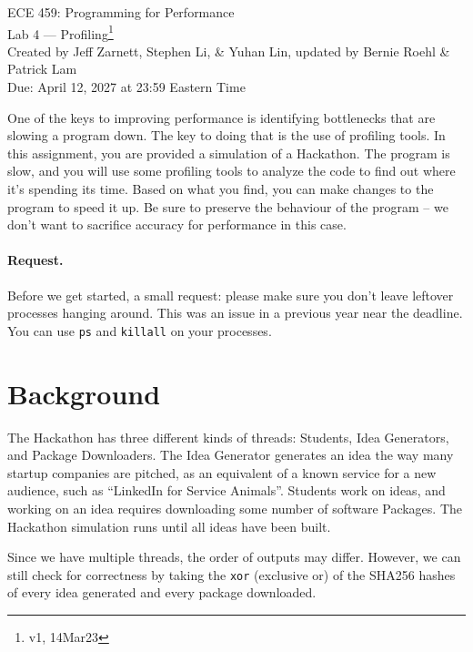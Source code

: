 



\begin{center}
{\Large ECE 459: Programming for Performance}\\
{\Large Lab 4 --- Profiling\footnote{v1, 14Mar23}}\\[1em]
{
Created by Jeff Zarnett, Stephen Li, \& Yuhan Lin, updated by Bernie Roehl \& Patrick Lam
}\\
Due: April 12, 2027 at 23:59 Eastern Time
\end{center}


One of the keys to improving performance is identifying bottlenecks that are slowing a program down. The key to doing that is the use of profiling tools. In this assignment, you are provided a simulation of a Hackathon. The program is slow, and you will use some profiling tools to analyze the code to find out where it's spending its time. Based on what you find, you can make changes to the program to speed it up. Be sure to preserve the behaviour of the program -- we don't want to sacrifice accuracy for performance in this case.

\paragraph{Request.} Before we get started, a small request: please make sure you don't leave leftover processes hanging around. This was an issue in a previous year near the deadline. You can use \texttt{ps} and \texttt{killall} on your processes.

\section*{Background}


The Hackathon has three different kinds of threads: Students, Idea Generators, and Package Downloaders. The Idea Generator generates an idea the way many startup companies are pitched, as an equivalent of a known service for a new audience, such as ``LinkedIn for Service Animals''. Students work on ideas, and working on an idea requires downloading some number of software Packages. The Hackathon simulation runs until all ideas have been built. 


Since we have multiple threads, the order of outputs may differ. However, we can still check for correctness by taking the \texttt{xor} (exclusive or) of the SHA256 hashes of every idea generated and every package downloaded. 

